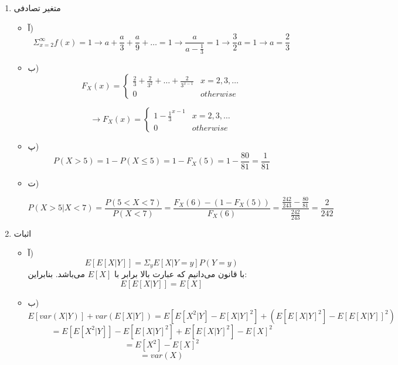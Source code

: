 
\begin{enumerate}
	\item متغیر تصادفی
	
	\begin{itemize}
		\item آ)
		\\
		$$\Sigma_{x = 2}^{\infty} f(x) = 1 \rightarrow
		 a + \frac{a}{3} + \frac{a}{9} + \dots = 1
		 \rightarrow
		 \frac{a}{a - \frac{1}{3}} = 1 
		 \rightarrow
		 \frac{3}{2} a = 1 
		 \rightarrow
		 a = \frac{2}{3}
		$$
		\item ب)
		$$
		F_X(x) = \begin{cases} 
		\frac{2}{3} + \frac{2}{3^2} + \dots + \frac{2}{3^{x - 1}}
		 &
		  x = 2, 3, \dots \\
		0 & otherwise
		\end{cases}
		$$
		
		$$
		\rightarrow F_X(x) = \begin{cases} 
		1 - \frac{1}{3}^{x - 1}
		&
		x = 2, 3, \dots \\
		0 & otherwise
		\end{cases}
		$$
		\item پ)
		$$P(X > 5) = 1 - P(X \leq 5)
		 = 1 - F_X(5)
		 = 1 - \frac{80}{81}
		 = \frac{1}{81} $$
		\item ت)
		
		$$P(X > 5 | X < 7) = 
		\frac{P(5 < X < 7)}{P(X < 7)} = \frac{F_X(6) - (1 - F_X(5))}{F_X(6)} = \frac{\frac{242}{243} - \frac{80}{81}}{\frac{242}{243}} = \frac{2}{242}
		$$
	\end{itemize}
	\item 
	اثبات
	\begin{itemize}
		\item آ)
		$$
		E[E[X|Y]] = \Sigma_{y} E[X|Y = y]P(Y = y)
		$$
		با قانون  می‌دانیم که عبارت بالا برابر با $E[X]$ می‌باشد. بنابراین:
		$$E[E[X|Y]] = E[X]$$
		\item ب)
		$$E[var(X|Y)] + var(E[X|Y])
		= E[E[X^2|Y] - E[X|Y]^2] + (E[E[X|Y]^2] - E[E[X|Y]]^2)
		$$
		$$
		= E[E[X^2| Y]] - E[E[X|Y]^2] + E[E[X|Y]^2] - E[X]^2
		$$
		$$
		= E[X^2] - E[X]^2
		$$
		$$
		= var(X)
		$$
	\end{itemize}
	
\end{enumerate}